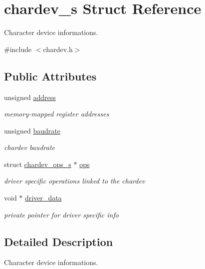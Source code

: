 \hypertarget{structchardev__s}{\section{chardev\-\_\-s Struct Reference}
\label{structchardev__s}
}


Character device informations.  




{\ttfamily \#include $<$chardev.\-h$>$}

\subsection*{Public Attributes}
\begin{DoxyCompactItemize}
\item 
unsigned \hyperlink{structchardev__s_add1481ed869132ee70ac2f97038eeb4f}{address}
\begin{DoxyCompactList}\small\item\em memory-\/mapped register addresses \end{DoxyCompactList}\item 
unsigned \hyperlink{structchardev__s_ae6c6d2be5ba0dcf1639a4953e745d95e}{baudrate}
\begin{DoxyCompactList}\small\item\em chardev baudrate \end{DoxyCompactList}\item 
struct \hyperlink{structchardev__ops__s}{chardev\-\_\-ops\-\_\-s} $\ast$ \hyperlink{structchardev__s_a0b18bf4649bf11afe6ac3f50239144b8}{ops}
\begin{DoxyCompactList}\small\item\em driver specific operations linked to the chardev \end{DoxyCompactList}\item 
void $\ast$ \hyperlink{structchardev__s_a2265cc57d5d141a86e93b0247db7022d}{driver\-\_\-data}
\begin{DoxyCompactList}\small\item\em private pointer for driver specific info \end{DoxyCompactList}\end{DoxyCompactItemize}


\subsection{Detailed Description}
Character device informations. 

